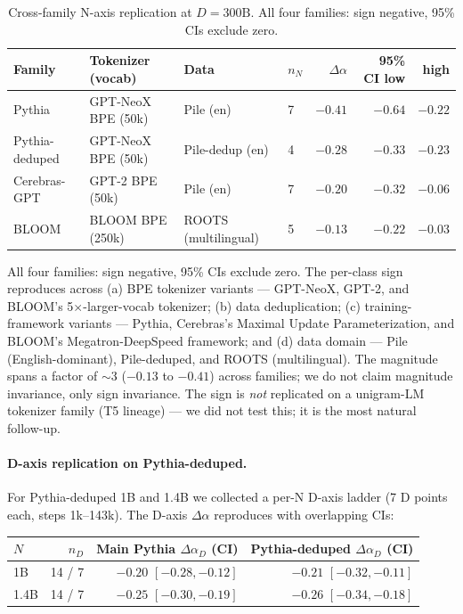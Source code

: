 \documentclass[10pt]{article}
\newcommand{\dalpha}{\Delta\alpha}
\begin{document}
\begin{table}[t]
\caption{Cross-family N-axis replication at $D{=}300\text{B}$. All four families: sign negative, 95\% CIs exclude zero.}
\label{tab:families}
\centering
\small
\begin{tabular}{llllrrr}
\toprule
Family & Tokenizer (vocab) & Data & $n_N$ & $\dalpha$ & 95\% CI low & high \\
\midrule
Pythia          & GPT-NeoX BPE (50k)  & Pile (en)              & 7 & $\mathbf{-0.41}$ & $-0.64$ & $-0.22$ \\
Pythia-deduped  & GPT-NeoX BPE (50k)  & Pile-dedup (en)        & 4 & $\mathbf{-0.28}$ & $-0.33$ & $-0.23$ \\
Cerebras-GPT    & GPT-2 BPE (50k)     & Pile (en)              & 7 & $\mathbf{-0.20}$ & $-0.32$ & $-0.06$ \\
BLOOM           & BLOOM BPE (250k)    & ROOTS (multilingual)   & 5 & $\mathbf{-0.13}$ & $-0.22$ & $-0.03$ \\
\bottomrule
\end{tabular}
\end{table}

All four families: sign negative, 95\% CIs exclude zero. The per-class
sign reproduces across (a) BPE tokenizer variants --- GPT-NeoX, GPT-2,
and BLOOM's 5$\times$-larger-vocab tokenizer; (b) data deduplication;
(c) training-framework variants --- Pythia, Cerebras's Maximal Update
Parameterization, and BLOOM's Megatron-DeepSpeed framework; and
(d) data domain --- Pile (English-dominant), Pile-deduped, and ROOTS
(multilingual). The magnitude spans a factor of $\sim$3 ($-0.13$ to
$-0.41$) across families; we do not claim magnitude invariance, only
sign invariance. The sign is \emph{not} replicated on a unigram-LM
tokenizer family (T5 lineage) --- we did not test this; it is the
most natural follow-up.

\paragraph{D-axis replication on Pythia-deduped.} For Pythia-deduped
1B and 1.4B we collected a per-N D-axis ladder (7 D points each,
steps 1k--143k). The D-axis $\dalpha$ reproduces with overlapping
CIs:

\begin{center}
\small
\begin{tabular}{lrrr}
\toprule
$N$ & $n_D$ & Main Pythia $\dalpha_D$ (CI) & Pythia-deduped $\dalpha_D$ (CI) \\
\midrule
1B   & 14 / 7 & $-0.20$ $[-0.28, -0.12]$ & $\mathbf{-0.21}$ $[-0.32, -0.11]$ \\
1.4B & 14 / 7 & $-0.25$ $[-0.30, -0.19]$ & $\mathbf{-0.26}$ $[-0.34, -0.18]$ \\
\bottomrule
\end{tabular}
\end{center}
\end{document}
